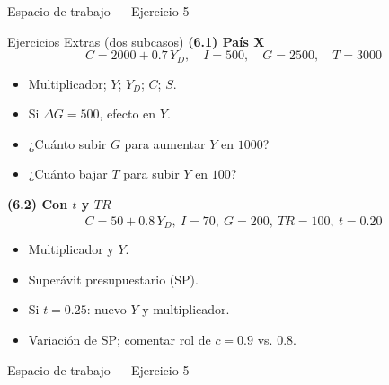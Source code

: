 \documentclass[aspectratio=169,10pt]{beamer}
\newcommand{\espacio}{\vfill\vfill}
\newcommand{\Yd}{Y_{\!D}}
\begin{document}
\begin{frame}{Espacio de trabajo — Ejercicio 5}
\espacio
\end{frame}
\begin{frame}{Ejercicios Extras (dos subcasos)}
\small
\textbf{(6.1) País X}
\[
C = 2000 + 0.7\,\Yd,\quad I=500,\quad G=2500,\quad T=3000
\]
\begin{itemize}\itemsep2pt
  \item Multiplicador; $Y$; $\Yd$; $C$; $S$.
  \item Si $\Delta G = 500$, efecto en $Y$.
  \item ¿Cuánto subir $G$ para aumentar $Y$ en $1000$?
  \item ¿Cuánto bajar $T$ para subir $Y$ en $100$?
\end{itemize}

\medskip
\textbf{(6.2) Con $t$ y $TR$}
\[
C = 50 + 0.8\,\Yd,\ \bar I=70,\ \bar G=200,\ TR=100,\ t=0.20
\]
\begin{itemize}\itemsep2pt
  \item Multiplicador y $Y$.
  \item Superávit presupuestario (SP).
  \item Si $t=0.25$: nuevo $Y$ y multiplicador.
  \item Variación de SP; comentar rol de $c=0.9$ vs. $0.8$.
\end{itemize}
\end{frame}

\begin{frame}{Espacio de trabajo — Ejercicio 5}
\espacio
\end{frame}
\end{document}
